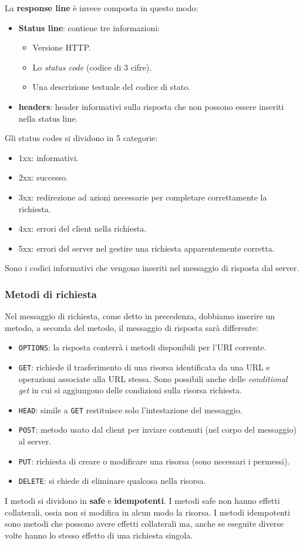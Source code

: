 La \textbf{response line} è invece composta in questo modo:
\begin{itemize}
	\item \textbf{Status line}: contiene tre informazioni:
		\begin{itemize}
			\item Versione HTTP.
			\item Lo \emph{status code} (codice di 3 cifre).
			\item Una descrizione testuale del codice di stato.
		\end{itemize}
	\item \textbf{headers}: header informativi sulla risposta che non possono essere inseriti
		nella status line.
\end{itemize}
Gli status codes si dividono in 5 categorie:
\begin{itemize}
	\item 1xx: informativi.
	\item 2xx: successo.
	\item 3xx: redirezione ad azioni necessarie per completare correttamente la richiesta.
	\item 4xx: errori del client nella richiesta.
	\item 5xx: errori del server nel gestire una richiesta apparentemente corretta.
\end{itemize}
Sono i codici informativi che vengono inseriti nel messaggio di risposta dal server.

\subsubsection{Metodi di richiesta}
Nel messaggio di richiesta, come detto in precedenza, dobbiamo inserire un metodo, a seconda del 
metodo, il messaggio di risposta sarà differente:
\begin{itemize}
	\item \verb|OPTIONS|: la risposta conterrà i metodi disponibili per l'URI corrente.
	\item \verb|GET|: richiede il trasferimento di una risorsa identificata da una URL e operazioni
		associate alla URL stessa. Sono possibili anche delle \emph{conditional get} in cui si
		aggiungono delle condizioni sulla risorsa richiesta.
	\item \verb|HEAD|: simile a \verb|GET| restituisce solo l'intestazione del messaggio.
	\item \verb|POST|: metodo usato dal client per inviare contenuti (nel corpo del messaggio) al
		server.
	\item \verb|PUT|: richiesta di creare o modificare una risorsa (sono necessari i permessi).
	\item \verb|DELETE|: si chiede di eliminare qualcosa nella risorsa.
\end{itemize}
I metodi si dividono in \textbf{safe} e \textbf{idempotenti}. I metodi safe non hanno effetti
collaterali, ossia non si modifica in alcun modo la risorsa. I metodi idempotenti sono metodi che
possono avere effetti collaterali ma, anche se eseguite diverse volte hanno lo stesso effetto di
una richiesta singola.

